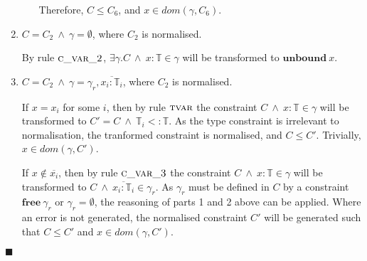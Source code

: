 \documentclass[preprint]{sigplanconf}
\newcommand{\cand}{\:\wedge\:}
\newcommand{\free}[1]{\mathbf{free}\:#1}
\newcommand{\tinf}{\mathbb{T}}
\newcommand{\qed}{$\blacksquare$}
\newenvironment{proof}{\vspace{1ex}\noindent{\bf Proof}\hspace{0.5em}}
  {\hfill\qed\vspace{1ex}}
\begin{document}
\begin{proof}
\begin{enumerate}
\begin{itemize}
Therefore, $C \leq C_6$, and $x \in dom(\gamma, C_6)$.
\end{itemize}

\item $C = C_2 \cand \gamma = \emptyset$, where $C_2$ is normalised.

By rule $\textsc{c\_var\_2}$, $\exists \gamma . C \cand x : \tinf \in \gamma$
will be transformed to $\mathbf{unbound}\:x$.

\item $C = C_2 \cand \gamma = \gamma_r, \overline{x_i : \tinf_i}$, where 
$C_2$ is normalised.

If $x = x_i$ for some $i$, then by rule $\textsc{tvar}$ the constraint
$C \cand x : \tinf \in \gamma$ will be transformed to $C' = C \cand \tinf_i <: \tinf$. As
the type constraint is irrelevant to normalisation, the tranformed constraint
is normalised, and $C \leq C'$. Trivially, $x \in dom(\gamma, C')$.

If $x \notin \overline{x_i}$, then by rule $\textsc{c\_var\_3}$ the
constraint $C \cand x : \tinf \in \gamma$ will be transformed to
$C \cand \overline{x_i : \tinf_i} \in \gamma_r$. As
$\gamma_r$ must be defined in $C$ by a constraint $\free{\gamma_r}$ or
$\gamma_r = \emptyset$, the reasoning of parts 1 and 2 above can be applied.
Where an error is not generated, the normalised constraint $C'$ will be
generated such that $C \leq C'$ and $x \in dom(\gamma, C')$.

\end{enumerate}
\end{proof}







\end{document}
